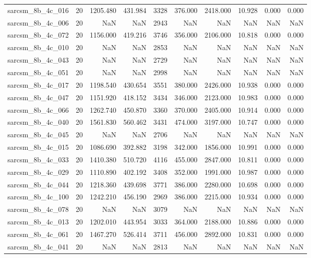 \begin{tabular}{lrrrrrrrrr}
sarcsm\_8b\_4c\_016 & 20 & 1205.480 & 431.984 & 3328 & 376.000 & 2418.000 & 10.928 & 0.000 & 0.000 \\
sarcsm\_8b\_4c\_006 & 20 & NaN & NaN & 2943 & NaN & NaN & NaN & NaN & NaN \\
sarcsm\_8b\_4c\_072 & 20 & 1156.000 & 419.216 & 3746 & 356.000 & 2106.000 & 10.818 & 0.000 & 0.000 \\
sarcsm\_8b\_4c\_010 & 20 & NaN & NaN & 2853 & NaN & NaN & NaN & NaN & NaN \\
sarcsm\_8b\_4c\_043 & 20 & NaN & NaN & 2729 & NaN & NaN & NaN & NaN & NaN \\
sarcsm\_8b\_4c\_051 & 20 & NaN & NaN & 2998 & NaN & NaN & NaN & NaN & NaN \\
sarcsm\_8b\_4c\_017 & 20 & 1198.540 & 430.654 & 3551 & 380.000 & 2426.000 & 10.938 & 0.000 & 0.000 \\
sarcsm\_8b\_4c\_047 & 20 & 1151.920 & 418.152 & 3434 & 346.000 & 2123.000 & 10.983 & 0.000 & 0.000 \\
sarcsm\_8b\_4c\_066 & 20 & 1262.740 & 450.870 & 3360 & 370.000 & 2405.000 & 10.914 & 0.000 & 0.000 \\
sarcsm\_8b\_4c\_040 & 20 & 1561.830 & 560.462 & 3431 & 474.000 & 3197.000 & 10.747 & 0.000 & 0.000 \\
sarcsm\_8b\_4c\_045 & 20 & NaN & NaN & 2706 & NaN & NaN & NaN & NaN & NaN \\
sarcsm\_8b\_4c\_015 & 20 & 1086.690 & 392.882 & 3198 & 342.000 & 1856.000 & 10.991 & 0.000 & 0.000 \\
sarcsm\_8b\_4c\_033 & 20 & 1410.380 & 510.720 & 4116 & 455.000 & 2847.000 & 10.811 & 0.000 & 0.000 \\
sarcsm\_8b\_4c\_029 & 20 & 1110.890 & 402.192 & 3408 & 352.000 & 1991.000 & 10.987 & 0.000 & 0.000 \\
sarcsm\_8b\_4c\_044 & 20 & 1218.360 & 439.698 & 3771 & 386.000 & 2280.000 & 10.698 & 0.000 & 0.000 \\
sarcsm\_8b\_4c\_100 & 20 & 1242.210 & 456.190 & 2969 & 386.000 & 2215.000 & 10.934 & 0.000 & 0.000 \\
sarcsm\_8b\_4c\_078 & 20 & NaN & NaN & 3079 & NaN & NaN & NaN & NaN & NaN \\
sarcsm\_8b\_4c\_013 & 20 & 1202.010 & 443.954 & 3033 & 364.000 & 2188.000 & 10.886 & 0.000 & 0.000 \\
sarcsm\_8b\_4c\_061 & 20 & 1467.270 & 526.414 & 3711 & 456.000 & 2892.000 & 10.831 & 0.000 & 0.000 \\
sarcsm\_8b\_4c\_041 & 20 & NaN & NaN & 2813 & NaN & NaN & NaN & NaN & NaN \\

\end{tabular}
